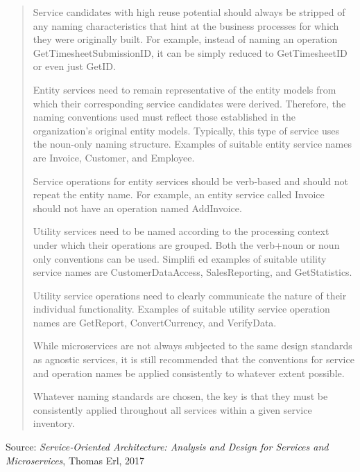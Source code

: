 \documentclass[Screen16to9,17pt]{foils}
\begin{document}

\begin{quote}\footnotesize
\begin{list2}\footnotesize
\item Service candidates with high reuse potential should always be stripped of any naming characteristics that hint at the business processes for which
they were originally built. For example, instead of naming an operation
GetTimesheetSubmissionID, it can be simply reduced to GetTimesheetID or
even just GetID.
\item Entity services need to remain representative of the entity models from which their corresponding service candidates were derived. Therefore, the naming conventions used must reflect those established in the organization’s original entity models. Typically, this type of service uses the noun-only naming structure. Examples of suitable entity service names are Invoice, Customer, and Employee.
\item Service operations for entity services should be verb-based and should not repeat the entity name. For example, an entity service called Invoice should not have an operation named AddInvoice.
\item Utility services need to be named according to the processing context under which their operations are grouped. Both the verb+noun or noun only conventions can be used. Simplifi ed examples of suitable utility service names are
CustomerDataAccess, SalesReporting, and GetStatistics.
\item Utility service operations need to clearly communicate the nature of their individual functionality. Examples of suitable utility service operation names are GetReport, ConvertCurrency, and VerifyData.
\item While microservices are not always subjected to the same design standards as agnostic services, it is still recommended that the conventions for service and operation names be applied consistently to whatever extent possible.
\end{list2}

Whatever naming standards are chosen, the key is that they must be consistently
applied throughout all services within a given service inventory.
\end{quote}

Source: {\footnotesize
\emph{Service‑Oriented Architecture: Analysis and Design for Services and Microservices}, Thomas Erl, 2017}


\end{document}
